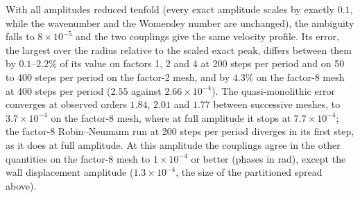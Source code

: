 With all amplitudes reduced tenfold (every exact amplitude scales by exactly $0.1$, while the wavenumber and the Womersley number are unchanged), the ambiguity falls to $8\times10^{-5}$ and the two couplings give the same velocity profile.
Its error, the largest over the radius relative to the scaled exact peak, differs between them by $0.1$--$2.2\%$ of its value on factors 1, 2 and 4 at 200 steps per period and on 50 to 400 steps per period on the factor-2 mesh, and by $4.3\%$ on the factor-8 mesh at 400 steps per period ($2.55$ against $2.66\times10^{-4}$).
The quasi-monolithic error converges at observed orders $1.84$, $2.01$ and $1.77$ between successive meshes, to $3.7\times10^{-4}$ on the factor-8 mesh, where at full amplitude it stops at $7.7\times10^{-4}$; the factor-8 Robin--Neumann run at 200 steps per period diverges in its first step, as it does at full amplitude.
At this amplitude the couplings agree in the other quantities on the factor-8 mesh to $1\times10^{-4}$ or better (phases in rad), except the wall displacement amplitude ($1.3\times10^{-4}$, the size of the partitioned spread above).
